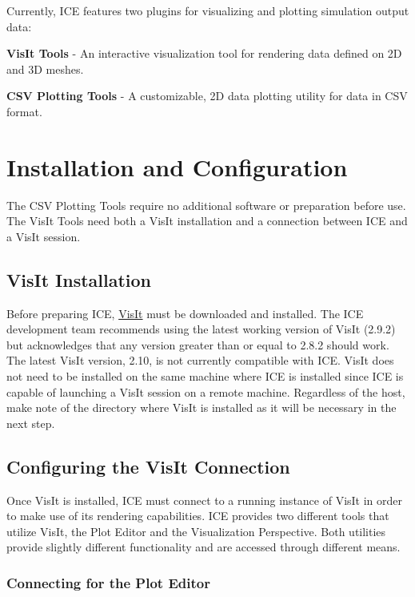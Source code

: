 Currently, ICE features two plugins for visualizing and plotting simulation
output data:

\textbf{VisIt Tools} - An interactive visualization tool for rendering data
defined on 2D and 3D meshes.

\textbf{CSV Plotting Tools} - A customizable, 2D data plotting utility for data
in CSV format.

\section{Installation and Configuration}

The CSV Plotting Tools require no additional software or preparation before use.
The VisIt Tools need both a VisIt installation and a connection between ICE and
a VisIt session.

\subsection{VisIt Installation} 

Before preparing ICE,
\href{https://wci.llnl.gov/simulation/computer-codes/visit/}{VisIt} must be
downloaded and installed. The ICE development team recommends using the latest
working version of VisIt (2.9.2) but acknowledges that any version greater than 
or equal to 2.8.2 should work. The latest VisIt version, 2.10, is not currently 
compatible with ICE. VisIt does not need to be installed on the same machine 
where ICE is installed since ICE is capable of launching a VisIt session on a 
remote machine. Regardless of the host, make note of the directory where VisIt 
is installed as it will be necessary in the next step.

\subsection{Configuring the VisIt Connection}

Once VisIt is installed, ICE must connect to a running instance of VisIt in
order to make use of its rendering capabilities. ICE provides two different
tools that utilize VisIt, the Plot Editor and the Visualization Perspective.
Both utilities provide slightly different functionality and are accessed
through different means.

\subsubsection{Connecting for the Plot Editor} 

